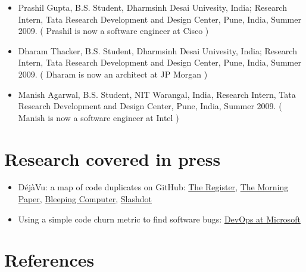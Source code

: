 \documentclass[letterpaper,11pt]{article}
\begin{document}
\begin{itemize}
\vspace{0pt}\item\small{Prashil Gupta, B.S. Student, Dharmsinh Desai Univesity, India;  Research Intern, Tata Research Development and Design Center, Pune, India, Summer 2009. ( Prashil is now a software engineer at Cisco )} \\
\vspace{0pt}\item\small{Dharam Thacker, B.S. Student, Dharmsinh Desai Univesity, India;  Research Intern, Tata Research Development and Design Center, Pune, India, Summer 2009. ( Dharam is now an architect at JP Morgan ) }\\
\vspace{0pt}\item\small{Manish Agarwal, B.S. Student, NIT Warangal, India, Research Intern, Tata Research Development and Design Center, Pune, India, Summer 2009. ( Manish is now a software engineer at Intel )} \\

\end{itemize}

\section{Research covered in press}

\begin{itemize}

\item\small{ DéjàVu: a map of code duplicates on GitHub:  \href{https://www.theregister.co.uk/2017/11/21/github_duplicate_code/}{\color{blue}The Register},  \href{https://blog.acolyer.org/2017/11/20/dejavu-a-map-of-code-duplicates-on-github/}{\color{blue}The Morning Paper},  \href{https://www.bleepingcomputer.com/news/software/82-percent-of-the-code-on-github-consists-of-clones-of-previously-created-files/}{\color{blue}Bleeping Computer},  \href{https://developers.slashdot.org/story/17/11/23/2352233/more-than-half-of-github-is-
duplicate-code-researchers-find/}{\color{blue}Slashdot} }

\item\small{Using a simple code churn metric to find software bugs:  \href{https://docs.microsoft.com/en-us/azure/devops/learn/devops-at-microsoft/using-simple-code-churn-metric-find-software-bugs}{\color{blue}DevOps at Microsoft} }

\end{itemize}

\section{References}
\end{document}
